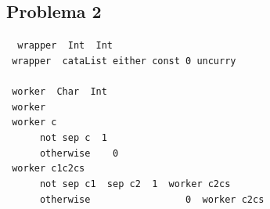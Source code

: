 \documentclass[a4paper]{article}
\begin{document}
\subsection*{Problema 2}

\begin{tabbing}\tt
~wrapper~~Int~~Int\\
\tt ~wrapper~~cataList~either~const~0~uncurry~\\
\tt ~\\
\tt ~worker~~Char~~Int\\
\tt ~worker~~~~~~~~~~~~~~~~~~~~~~~~\\
\tt ~worker~c\\
\tt ~~~~~~not~sep~c~~1\\
\tt ~~~~~~otherwise~~~~0\\
\tt ~worker~c1c2cs\\
\tt ~~~~~~not~sep~c1~~sep~c2~~1~~worker~c2cs\\
\tt ~~~~~~otherwise~~~~~~~~~~~~~~~~~0~~worker~c2cs
\end{tabbing}
\end{document}
